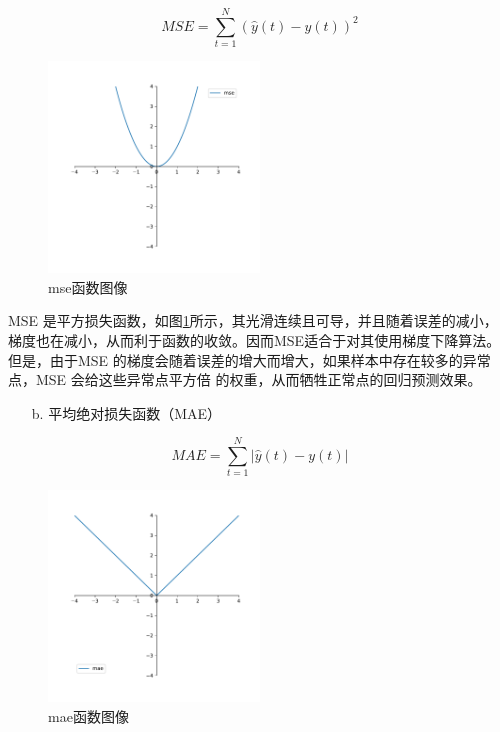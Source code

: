 \documentclass[AutoFakeBold]{LZUThesis}
\begin{document}
$$MSE=\sum_{t=1}^{N}\left(\hat{y}\left(t\right)-y\left(t\right)\right)^2$$

\begin{figure}[H]
	\centering
    \includegraphics[width=0.5\textwidth]{figures/mse.pdf}
    \caption{mse函数图像}
    \label{fig_mse}
\end{figure}

MSE 是平方损失函数，如图\ref{fig_mse}所示，其光滑连续且可导，并且随着误差的减小，
梯度也在减小，从而利于函数的收敛。因而MSE适合于对其使用梯度下降算法。但是，由于MSE
的梯度会随着误差的增大而增大，如果样本中存在较多的异常点，MSE 会给这些异常点平方倍
的权重，从而牺牲正常点的回归预测效果。

\begin{itemize}
    \item[b. ] 平均绝对损失函数（MAE）
\end{itemize}

$$MAE=\sum_{t=1}^{N}\left|\hat{y}\left(t\right)-y\left(t\right)\right|$$

\begin{figure}[H]
	\centering
    \includegraphics[width=0.5\textwidth]{figures/mae.pdf}
    \caption{mae函数图像}
    \label{fig_mae}
\end{figure}
\end{document}
